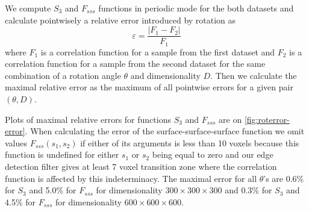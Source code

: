 \documentclass[reprint,amsmath,amssymb,aps,pre,showkeys,showpacs]{revtex4-1}
\begin{document}
We compute $S_3$ and $F_{sss}$ functions in periodic mode for the both datasets
and calculate pointwisely a relative error introduced by rotation as
\begin{equation}
  \varepsilon = \frac{|F_1 - F_2|}{F_1}
  \label{eq:relerr}
\end{equation}
where $F_1$ is a correlation function for a sample from the first dataset and
$F_2$ is a correlation function for a sample from the second dataset for the
same combination of a rotation angle $\theta$ and dimensionality $D$. Then we
calculate the maximal relative error as the maximum of all pointwise errors for
a given pair $(\theta, D)$.

Plots of maximal relative errors for functions $S_3$ and $F_{sss}$ are on
\cref{fig:roterror-error}. When calculating the error of the
surface-surface-surface function we omit values $F_{sss}(s_1, s_2)$ if either of
its arguments is less than 10 voxels because this function is undefined for
either $s_1$ or $s_2$ being equal to zero and our edge detection filter gives at
least 7 voxel transition zone where the correlation function is affected by this
indeterminacy. The maximal error for all $\theta$'s are 0.6\% for $S_3$ and 5.0\%
for $F_{sss}$ for dimensionality $300 \times 300 \times 300$ and 0.3\% for $S_3$
and 4.5\% for $F_{sss}$ for dimensionality $600 \times 600 \times 600$.
\end{document}
